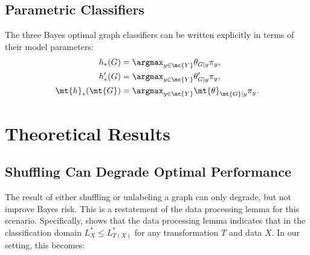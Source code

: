 
\subsection{Parametric Classifiers} %
\label{sub:parametric_classifiers}


The three Bayes optimal graph classifiers can be written explicitly in terms of their model parameters:
\begin{align}
	h_*(G) &= \argmax_{y \in \mc{Y}} \theta_{G|y}\pi_y, \\
	h_*'(G) &= \argmax_{y \in \mc{Y}} \theta_{G|y}' \pi_y, \\
	\mt{h}_*(\mt{G}) &= \argmax_{y \in \mc{Y}}  \mt{\theta}_{\mt{G}|y}\pi_y. \label{eq:unbayes2}
\end{align}




\section{Theoretical Results} %
\label{sec:theoretical_results}

\subsection{Shuffling Can Degrade Optimal Performance} %
\label{sec:shuffle}





The result of either shuffling or unlabeling a graph can only degrade, but not improve Bayes risk.  This is a restatement of the data processing lemma for this scenario. Specifically, \cite{Devroye1996} shows that the data processing lemma indicates that in the classification domain $L^*_X \leq L^*_{T(X)}$ for any transformation $T$ and data $X$.  In our setting, this becomes:

